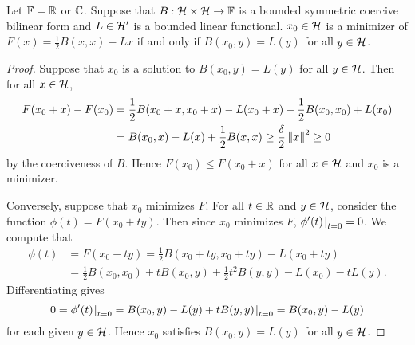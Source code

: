 \begin{theorem}
    Let $\mathbb{F} = \mathbb{R}$ or $\mathbb{C}$. Suppose that $B:\mathcal{H}\times\mathcal{H}\to\mathbb{F}$ is 
    a bounded symmetric coercive bilinear form and $L\in\mathcal{H}'$ is a bounded 
    linear functional. $x_0\in\mathcal{H}$ is a minimizer of $F(x) = \frac{1}{2}B(x,x) - Lx$ 
    if and only if $B(x_0,y) = L(y)$ for all $y\in\mathcal{H}$.
\end{theorem}
\begin{proof}
    Suppose that $x_0$ is a solution to $B(x_0,y) = L(y)$ for all $y\in\mathcal{H}$. 
    Then for all $x\in\mathcal{H}$, 
    \begin{equation*}
        \begin{split}
            F(x_0 + x) - F(x_0) &= \frac{1}{2}B(x_0 + x, x_0 + x) - L(x_0 + x) - \frac{1}{2}B(x_0,x_0) + L(x_0) \\
            &= B(x_0,x) - L(x) + \frac{1}{2}B(x,x) \geq \frac{\delta}{2}\left\lVert {x} \right\rVert^2\geq 0
        \end{split}
    \end{equation*}
    by the coerciveness of $B$. Hence $F(x_0)\leq F(x_0 + x)$ for all $x\in\mathcal{H}$ and 
    $x_0$ is a minimizer. 

    Conversely, suppose that $x_0$ minimizes $F$. For all $t\in\mathbb{R}$ and $y\in\mathcal{H}$, 
    consider the function $\phi(t) = F(x_0 + ty)$. Then since $x_0$ minimizes $F$, 
    $\phi'(t)\left.\hspace{-0.2em}\right|_{t=0} = 0$. We compute that 
    \begin{equation*}
        \begin{split}
            \phi(t) &= F(x_0 + ty) = \frac{1}{2}B(x_0 + ty, x_0 + ty) - L(x_0 + ty) \\
            &= \frac{1}{2}B(x_0,x_0) + tB(x_0,y) + \frac{1}{2}t^2B(y,y) - L(x_0) - tL(y).
        \end{split}
    \end{equation*}
    Differentiating gives 
    \begin{equation*}
        0 = \phi'(t)\left.\hspace{-0.2em}\right|_{t=0} = B(x_0,y) - L(y) + tB(y,y)\left.\hspace{-0.2em}\right|_{t=0} = B(x_0,y) - L(y)
    \end{equation*}
    for each given $y\in\mathcal{H}$. Hence $x_0$ satisfies $B(x_0,y) = L(y)$ for all $y\in\mathcal{H}$.
\end{proof}